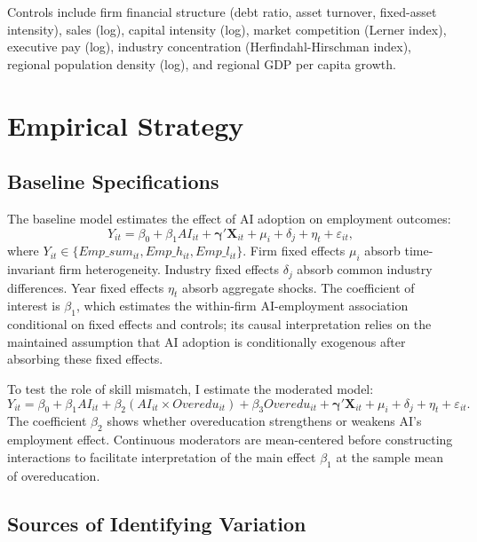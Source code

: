 \documentclass[12pt,a4paper]{article}
\theoremstyle{predstyle}
\theoremstyle{plain}
\newcommand{\Overedu}{\mathit{Overedu}}
\begin{document}
Controls include firm financial structure (debt ratio, asset turnover, fixed-asset intensity), sales (log), capital intensity (log), market competition (Lerner index), executive pay (log), industry concentration (Herfindahl-Hirschman index), regional population density (log), and regional GDP per capita growth.

\section{Empirical Strategy}
\label{sec:strategy}

\subsection{Baseline Specifications}

The baseline model estimates the effect of AI adoption on employment outcomes:
\begin{equation}
Y_{it}
= \beta_0 + \beta_1 AI_{it}
+ \boldsymbol{\gamma}'\mathbf{X}_{it}
+ \mu_i + \delta_j + \eta_t + \varepsilon_{it},
\label{eq:base}
\end{equation}
where \(Y_{it}\in\{Emp\_sum_{it}, Emp\_h_{it}, Emp\_l_{it}\}\). Firm fixed effects \(\mu_i\) absorb time-invariant firm heterogeneity. Industry fixed effects \(\delta_j\) absorb common industry differences. Year fixed effects \(\eta_t\) absorb aggregate shocks. The coefficient of interest is \(\beta_1\), which estimates the within-firm AI-employment association conditional on fixed effects and controls; its causal interpretation relies on the maintained assumption that AI adoption is conditionally exogenous after absorbing these fixed effects.

To test the role of skill mismatch, I estimate the moderated model:
\begin{equation}
Y_{it}
= \beta_0 + \beta_1 AI_{it}
+ \beta_2 (AI_{it}\times \Overedu_{it})
+ \beta_3 \Overedu_{it}
+ \boldsymbol{\gamma}'\mathbf{X}_{it}
+ \mu_i + \delta_j + \eta_t + \varepsilon_{it}.
\label{eq:mod}
\end{equation}
The coefficient \(\beta_2\) shows whether overeducation strengthens or weakens AI's employment effect. Continuous moderators are mean-centered before constructing interactions to facilitate interpretation of the main effect \(\beta_1\) at the sample mean of overeducation.

\subsection{Sources of Identifying Variation}
\end{document}
